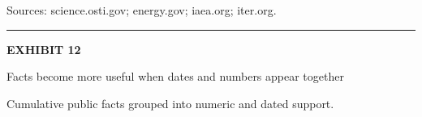 \documentclass[10pt,a4paper]{article}
\begin{document}
\par
{\scriptsize\color{BOMuted} Sources: science.osti.gov; energy.gov; iaea.org; iter.org.}\par
\vspace{9pt}\textcolor{BOLine}{\rule{\linewidth}{0.3pt}}\vspace{8pt}
{\textcolor{BOGreen}{\scriptsize\bfseries EXHIBIT 12}}\par\vspace{4pt}
{\sffamily\fontsize{17}{21}\selectfont\color{BONavy} Facts become more useful when dates and numbers appear together}\par
{\small\color{BOText} Cumulative public facts grouped into numeric and dated support.}\par\vspace{6pt}
\end{document}
